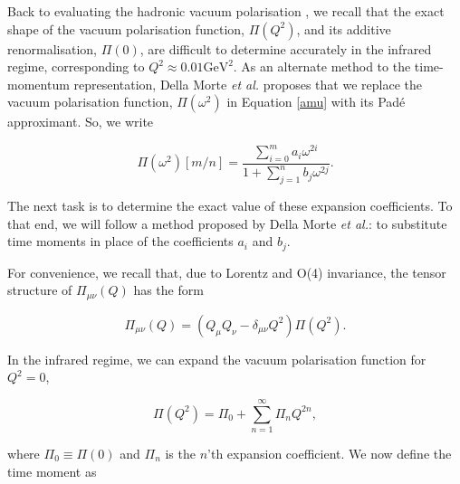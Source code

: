 \documentclass{article}
\numberwithin{equation}{section} %
\begin{document}
Back to evaluating the hadronic vacuum polarisation , we recall that the exact shape of the vacuum polarisation function, $\Pi(Q^2)$, and its additive renormalisation, $\Pi(0)$, are difficult to determine accurately in the infrared regime, corresponding to $Q^2 \approx 0.01\mathrm{GeV}^2$\cite{dellamorte}. As an alternate method to the time-momentum representation, Della Morte \textit{et al.}\cite{dellamorte} proposes that we replace the vacuum polarisation function, $\Pi(\omega^2)$ in Equation \ref{amu} with its Pad\'{e} approximant. So, we write

\begin{equation}
\Pi(\omega^2)[m/n] = \frac{\sum_{i=0}^ma_i\omega^{2i}}{1+\sum_{j=1}^nb_j\omega^{2j}}.
\end{equation}

The next task is to determine the exact value of these expansion coefficients. To that end, we will follow a method proposed by Della Morte \textit{et al.}: to substitute time moments in place of the coefficients $a_i$ and $b_j$.

For convenience, we recall that, due to Lorentz and O(4) invariance\cite{vector}, the tensor structure of $\Pi_{\mu\nu}(Q)$ has the form 

\begin{equation}
\Pi_{\mu\nu}(Q) = \left( Q_\mu Q_\nu - \delta_{\mu\nu} Q^2 \right)\Pi(Q^2).
\end{equation}

In the infrared regime, we can expand the vacuum polarisation function for $Q^2=0$,

\begin{equation}
\Pi(Q^2) = \Pi_0 + \sum_{n=1}^\infty \Pi_n Q^{2n},
\label{hvpf expansion}
\end{equation}

\noindent where $\Pi_0 \equiv \Pi(0)$ and $\Pi_n$ is the $n$'th expansion coefficient. We now define the time moment as


%
%
\end{document}
